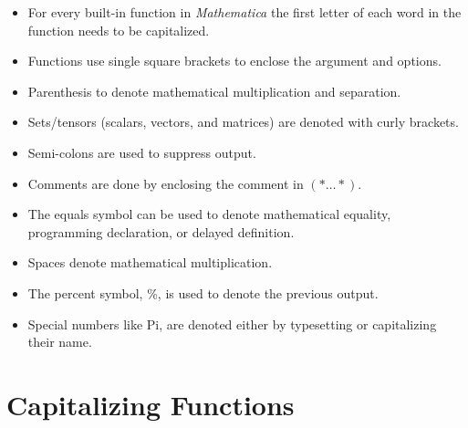 \documentclass[11pt,letterpaper,twoside,titlepage]{report}
\newcommand{\Mathematica}{\textit{Mathematica} }
\begin{document}
		\begin{itemize}
		
			\item %
			
				For every built-in function in \Mathematica the first letter of each word in the function needs to be capitalized.
				
			\item %
			
				Functions use single square brackets to enclose the argument and options.
				
			\item %
			
				Parenthesis to denote mathematical multiplication and separation.
				
			\item %
			
				Sets/tensors (scalars, vectors, and matrices) are denoted with curly brackets.
				
			\item %
			
				Semi-colons are used to suppress output.
				
			\item %
			
				Comments are done by enclosing the comment in $(* \dots *)$.
				
			\item %
			
				The equals symbol can be used to denote mathematical equality, programming declaration, or delayed definition.
				
			\item %
			
				Spaces denote mathematical multiplication.
				
			\item %
			
				The percent symbol, \%, is used to denote the previous output.
				
			\item %
			
				Special numbers like Pi, are denoted either by typesetting or capitalizing their name.
		
		\end{itemize}

		\chapter{Capitalizing Functions}
			
\end{document}
